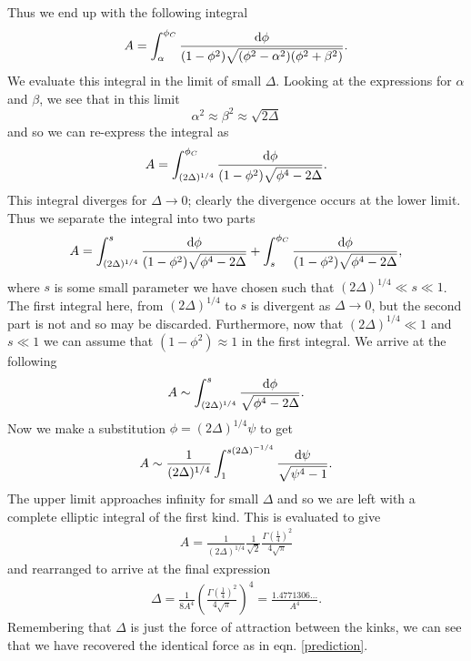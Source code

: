 \documentclass[11pt, oneside]{article}  	%
\numberwithin{equation}{section}
\newcommand{\drv}{\ensuremath{\textup{d}}}
\begin{document}
Thus we end up with the following integral
\begin{align}
    A =  \int_{\alpha}^{\phi_C} \frac{\drv \phi}{ (1-\phi^2) \sqrt{(\phi^2 - \alpha^2)(\phi^2 + \beta^2)} }.
\end{align}
We evaluate this integral in the limit of small $\Delta$. Looking at the expressions for $\alpha$ and $\beta$, we see that in this limit
\begin{equation}
    \alpha^2 \approx \beta^2 \approx \sqrt{2\Delta}
\end{equation}
and so we can re-express the integral as
\begin{align}
    A = \int_{(2\Delta)^{1/4}}^{\phi_C} \frac{\drv \phi}{ (1-\phi^2) \sqrt{\phi^4 - 2\Delta} }.
\end{align}
This integral diverges for $\Delta \rightarrow 0$; clearly the divergence occurs at the lower limit. Thus we separate the integral into two parts
\begin{align}
    A =  \int_{(2\Delta)^{1/4}}^{s} \frac{\drv \phi}{ (1-\phi^2) \sqrt{\phi^4 -2\Delta} } +  \int_{s}^{\phi_C} \frac{\drv \phi}{ (1-\phi^2) \sqrt{\phi^4 - 2\Delta} },
\end{align}
where $s$ is some small parameter we have chosen such that $(2\Delta)^{1/4} \ll s \ll 1$. The first integral here, from $(2\Delta)^{1/4}$ to $s$ is divergent as $\Delta \rightarrow 0$, but the second part is not and so may be discarded. Furthermore, now that $(2\Delta)^{1/4} \ll 1 $ and $s\ll 1$ we can assume that $(1-\phi^2) \approx 1$ in the first integral. We arrive at the following
\begin{align}
    A \sim  \int_{(2\Delta)^{1/4}}^{s} \frac{\drv \phi}{ \sqrt{\phi^4 - 2\Delta} } .
\end{align}
Now we make a substitution $\phi = (2\Delta)^{1/4} \psi$ to get
\begin{align}
    A \sim \frac{1}{(2\Delta)^{1/4}} \int_{1}^{s (2\Delta)^{-1/4}} \frac{\drv \psi}{ \sqrt{\psi^4 - 1} } .
\end{align}
The upper limit approaches infinity for small $\Delta$ and so we are left with a complete elliptic integral of the first kind. This is evaluated to give
\begin{align}
A = \frac{1}{(2\Delta)^{1/4}} \frac{1}{\sqrt{2}}\frac{\Gamma (\frac{1}{4})^2}{4\sqrt{\pi}}
\end{align}
and rearranged to arrive at the final expression
\begin{align}
\Delta = \frac{1}{8A^4} \left ( \frac{\Gamma (\frac{1}{4})^2}{4\sqrt{\pi}}\right )^4 = \frac{1.4771306...}{A^4}  .
\end{align}
Remembering that $\Delta$ is just the force of attraction between the kinks, we can see that we have recovered the identical force as in eqn. \ref{prediction}.
\end{document}
